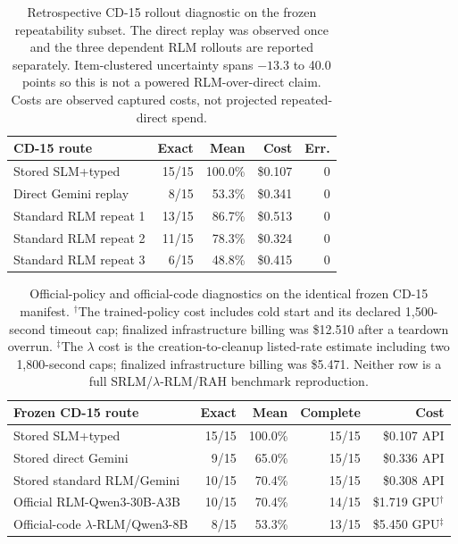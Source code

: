 \documentclass[letterpaper]{article}
\begin{document}
\begin{table}[!t]
\centering
\small
\setlength{\tabcolsep}{3pt}
\begin{tabular}{@{}p{7.0cm}rrrr@{}}
\toprule
\textbf{CD-15 route} & \textbf{Exact} & \textbf{Mean} & \textbf{Cost} & \textbf{Err.} \\
\midrule
Stored SLM+typed & 15/15 & 100.0\% & \$0.107 & 0 \\
Direct Gemini replay & 8/15 & 53.3\% & \$0.341 & 0 \\
Standard RLM repeat 1 & 13/15 & 86.7\% & \$0.513 & 0 \\
Standard RLM repeat 2 & 11/15 & 78.3\% & \$0.324 & 0 \\
Standard RLM repeat 3 & 6/15 & 48.8\% & \$0.415 & 0 \\
\bottomrule
\end{tabular}
\caption{Retrospective CD-15 rollout diagnostic on the frozen repeatability subset. The direct replay was observed once and the three dependent RLM rollouts are reported separately. Item-clustered uncertainty spans $-13.3$ to 40.0 points so this is not a powered RLM-over-direct claim. Costs are observed captured costs, not projected repeated-direct spend.}
\label{tab:supp-cd15-positive-lock}
\end{table}

\begin{table}[!t]
\centering
\small
\setlength{\tabcolsep}{3pt}
\begin{tabular}{@{}p{8.0cm}rrrr@{}}
\toprule
\textbf{Frozen CD-15 route} & \textbf{Exact} & \textbf{Mean} & \textbf{Complete} & \textbf{Cost} \\
\midrule
Stored SLM+typed & 15/15 & 100.0\% & 15/15 & \$0.107 API \\
Stored direct Gemini & 9/15 & 65.0\% & 15/15 & \$0.336 API \\
Stored standard RLM/Gemini & 10/15 & 70.4\% & 15/15 & \$0.308 API \\
Official RLM-Qwen3-30B-A3B & 10/15 & 70.4\% & 14/15 & \$1.719 GPU$^{\dagger}$ \\
Official-code $\lambda$-RLM/Qwen3-8B & 8/15 & 53.3\% & 13/15 & \$5.450 GPU$^{\ddagger}$ \\
\bottomrule
\end{tabular}
\caption{Official-policy and official-code diagnostics on the identical frozen CD-15 manifest. $^{\dagger}$The trained-policy cost includes cold start and its declared 1,500-second timeout cap; finalized infrastructure billing was \$12.510 after a teardown overrun. $^{\ddagger}$The $\lambda$ cost is the creation-to-cleanup listed-rate estimate including two 1,800-second caps; finalized infrastructure billing was \$5.471. Neither row is a full SRLM/$\lambda$-RLM/RAH benchmark reproduction.}
\label{tab:supp-cd15-official-qwen}
\end{table}
\end{document}
